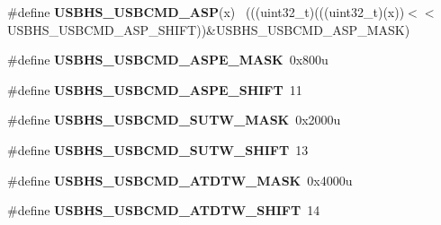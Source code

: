\begin{DoxyCompactItemize}
\item 
\hypertarget{group___u_s_b_h_s___register___masks_ga7c73e095707f0775d87cebff43ebb904}{}\#define {\bfseries U\+S\+B\+H\+S\+\_\+\+U\+S\+B\+C\+M\+D\+\_\+\+A\+S\+P}(x)                                        ~(((uint32\+\_\+t)(((uint32\+\_\+t)(x))$<$$<$U\+S\+B\+H\+S\+\_\+\+U\+S\+B\+C\+M\+D\+\_\+\+A\+S\+P\+\_\+\+S\+H\+I\+F\+T))\&U\+S\+B\+H\+S\+\_\+\+U\+S\+B\+C\+M\+D\+\_\+\+A\+S\+P\+\_\+\+M\+A\+S\+K)\label{group___u_s_b_h_s___register___masks_ga7c73e095707f0775d87cebff43ebb904}

\item 
\hypertarget{group___u_s_b_h_s___register___masks_ga1f864d79a92bbff98811088cee20e667}{}\#define {\bfseries U\+S\+B\+H\+S\+\_\+\+U\+S\+B\+C\+M\+D\+\_\+\+A\+S\+P\+E\+\_\+\+M\+A\+S\+K}~0x800u\label{group___u_s_b_h_s___register___masks_ga1f864d79a92bbff98811088cee20e667}

\item 
\hypertarget{group___u_s_b_h_s___register___masks_ga68d453f21751d08c305d0b3f512b3ab7}{}\#define {\bfseries U\+S\+B\+H\+S\+\_\+\+U\+S\+B\+C\+M\+D\+\_\+\+A\+S\+P\+E\+\_\+\+S\+H\+I\+F\+T}~11\label{group___u_s_b_h_s___register___masks_ga68d453f21751d08c305d0b3f512b3ab7}

\item 
\hypertarget{group___u_s_b_h_s___register___masks_ga632957538571abce395cc5244e415c0e}{}\#define {\bfseries U\+S\+B\+H\+S\+\_\+\+U\+S\+B\+C\+M\+D\+\_\+\+S\+U\+T\+W\+\_\+\+M\+A\+S\+K}~0x2000u\label{group___u_s_b_h_s___register___masks_ga632957538571abce395cc5244e415c0e}

\item 
\hypertarget{group___u_s_b_h_s___register___masks_ga65a5ee64ab119bab194d6a40dce02670}{}\#define {\bfseries U\+S\+B\+H\+S\+\_\+\+U\+S\+B\+C\+M\+D\+\_\+\+S\+U\+T\+W\+\_\+\+S\+H\+I\+F\+T}~13\label{group___u_s_b_h_s___register___masks_ga65a5ee64ab119bab194d6a40dce02670}

\item 
\hypertarget{group___u_s_b_h_s___register___masks_ga8f0507a208e47bb2eaa3ead9b1a0665a}{}\#define {\bfseries U\+S\+B\+H\+S\+\_\+\+U\+S\+B\+C\+M\+D\+\_\+\+A\+T\+D\+T\+W\+\_\+\+M\+A\+S\+K}~0x4000u\label{group___u_s_b_h_s___register___masks_ga8f0507a208e47bb2eaa3ead9b1a0665a}

\item 
\hypertarget{group___u_s_b_h_s___register___masks_gaf0b0ed035bf1b11a83b2b63f8fae4cbd}{}\#define {\bfseries U\+S\+B\+H\+S\+\_\+\+U\+S\+B\+C\+M\+D\+\_\+\+A\+T\+D\+T\+W\+\_\+\+S\+H\+I\+F\+T}~14\label{group___u_s_b_h_s___register___masks_gaf0b0ed035bf1b11a83b2b63f8fae4cbd}


\end{DoxyCompactItemize}
